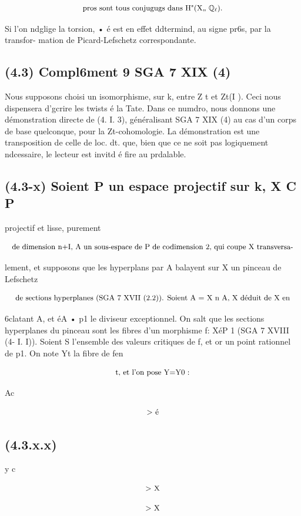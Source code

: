 \documentclass[11pt]{article}
\theoremstyle{remark}
\begin{document}
\[\text{\small pros sont tous conjugugs dans H"(X,, \(\mathbb{Q}_{\ell}\)).}\]

Si l'on ndglige la torsion, • é est en effet ddtermind, au signe pr6s, par la transfor- mation de Picard-Lefschetz correspondante.

\subsection*{(4.3) Compl6ment  9 SGA 7 XIX (4)}

Nous supposons choisi un isomorphisme, sur k, entre Z t et Zt(I ). Ceci nous dispensera d'gcrire les twists é la Tate. Dans ce numdro, nous donnons une démonstration directe de (4. I. 3), généralisant SGA 7 XIX (4) au cas d'un corps de base quelconque, pour la Zt-cohomologie. La démonstration est une transposition de celle de loc. dt. que, bien que ce ne soit pas logiquement ndcessaire, le lecteur est invitd é fire au prdalable.

\subsection*{(4.3-x) Soient P un espace projectif sur k, X C P}

projectif et lisse, purement

\[\text{\small de dimension n+I, A un sous-espace de P de codimension 2, qui coupe X transversa-}\]

lement, et supposons que les hyperplans par A balayent sur X un pinceau de Lefschetz

\[\text{\small de sections hyperplanes (SGA 7 XVII (2.2)). Soient A = X n A, X déduit de X en}\]

6clatant A, et éA • p1 le diviseur exceptionnel. On salt que les sections hyperplanes du pinceau sont les fibres d'un morphisme f: XéP 1 (SGA 7 XVIII (4- I. I)). Soient S l'ensemble des valeurs critiques de f, et or un point rationnel de p1. On note Yt la fibre de fen

\[\text{\small t, et l'on pose Y=Y0 :}\]

Ac

\[\text{\small > é}\]

\subsection*{(4.3.x.x)}

y c

\[\text{\small > X}\]

\[\text{\small > X}\]
\end{document}
